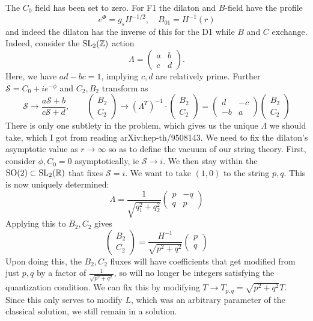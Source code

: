 \documentclass[11pt, class=article, crop=false]{standalone}
\begin{document}
\begin{enumerate}
	The $C_0$ field has been set to zero. For F1 the dilaton and $B$-field have the profile
	\[
		e^{\Phi} = g_s H^{-1/2}, \quad B_{01} = H^{-1}(r)
	\]
	and indeed the dilaton has the inverse of this for the D1 while $B$ and $C$ exchange. Indeed, consider the $\mathrm{SL}_2(\mathbb{Z})$ action 
	\[
		\Lambda = \begin{pmatrix}
			a & b \\  c & d
		\end{pmatrix}.
	\]
	Here, we have $ad-bc = 1$, implying $c, d$ are relatively prime. Further $\mathcal S = C_0 + i e^{-\phi}$ and $C_2, B_2$ transform as
	\[
		\mathcal S \to \frac{a \mathcal S + b}{c \mathcal S + d}, \qquad \begin{pmatrix}
			B_2\\C_2
		\end{pmatrix} \to (\Lambda^T)^{-1} \cdot \begin{pmatrix}
			B_2 \\ C_2
		\end{pmatrix} = \begin{pmatrix}
			d & -c\\ -b & a
		\end{pmatrix}   \begin{pmatrix}
			B_2 \\ C_2
		\end{pmatrix}
	\]
	There is only one subtlety in the problem, which gives us the unique $\Lambda$ we should take, which I got from reading arXiv:hep-th/9508143. We need to fix the dilaton's asymptotic value as $r \to \infty$ so as to define the vacuum of our string theory. First, consider $\phi, C_0 = 0$ asymptotically, ie $\mathcal S \to i$. We then stay within the $\mathrm{SO}(2) \subset  \mathrm{SL}_2(\mathbb{R})$ that fixes $\mathcal S = i$. We want to take $(1,0)$ to the string $p, q$. This is now uniquely determined:
	\[
		\Lambda = \frac{1}{\sqrt{q_1^2 + q_2^2}} \begin{pmatrix}
			p & -q\\
			q & p
		\end{pmatrix}
	\]
	Applying this to $B_2, C_2$ gives
	\[
		\begin{pmatrix}
					B_2\\ C_2
				\end{pmatrix} = \frac{H^{-1}}{\sqrt{p^2 + q^2}} \begin{pmatrix}
					p\\q
				\end{pmatrix}
	\]
	Upon doing this, the $B_2, C_2$ fluxes will have coefficients that get modified from just $p, q$ by a factor of $\frac{1}{\sqrt{p^2 + q^2}}$, so will no longer be integers satisfying the quantization condition. We can fix this by modifying $T \to T_{p,q} = \sqrt{p^2 + q^2} T$. Since this only serves to modify $L$, which was an arbitrary parameter of the classical solution, we still remain in a solution.
	

\end{enumerate}
\end{document}
